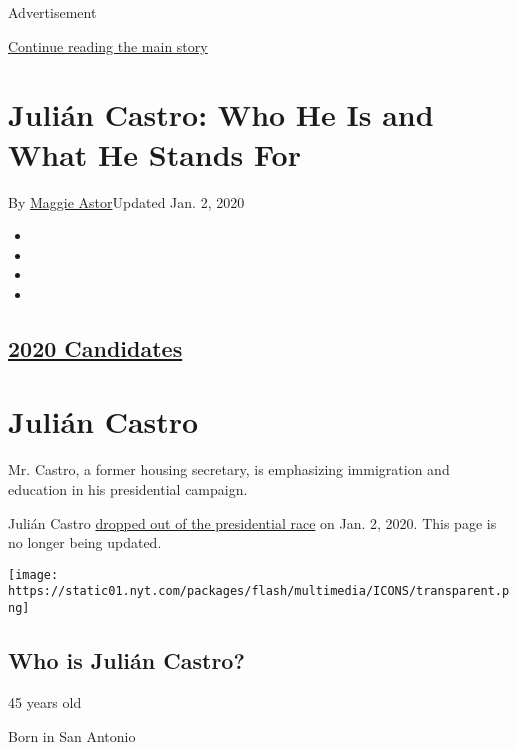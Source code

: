 Advertisement

\protect\hyperlink{after-top}{Continue reading the main story}

\hypertarget{juliuxe1n-castro-who-he-is-and-what-he-stands-for}{%
\section{Julián Castro: Who He Is and What He Stands
For}\label{juliuxe1n-castro-who-he-is-and-what-he-stands-for}}

By \href{https://www.nytimes.com/by/maggie-astor}{Maggie Astor}Updated
Jan. 2, 2020

\begin{itemize}
\item
\item
\item
\item
\end{itemize}

\hypertarget{2020-candidates}{%
\subsection{\texorpdfstring{\href{https://www.nytimes.com/interactive/2019/us/politics/2020-presidential-candidates.html}{2020
Candidates}}{2020 Candidates}}\label{2020-candidates}}

\hypertarget{juliuxe1n-castro}{%
\section{Julián Castro}\label{juliuxe1n-castro}}

Mr. Castro, a former housing secretary, is emphasizing immigration and
education in his presidential campaign.

Julián Castro
\href{https://www.nytimes.com/2020/01/02/us/politics/julian-castro-dropping-out.html}{dropped
out of the presidential race} on Jan. 2, 2020. This page is no longer
being updated.

\texttt{[image: https://static01.nyt.com/packages/flash/multimedia/ICONS/transparent.png]}

\hypertarget{who-is-juliuxe1n-castro}{%
\subsection{Who is Julián Castro?}\label{who-is-juliuxe1n-castro}}

45 years old

Born in San Antonio

